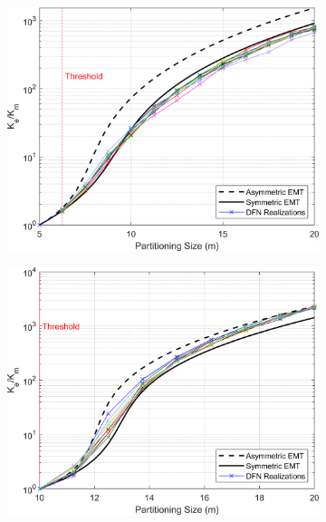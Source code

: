 \documentclass[main.tex]{subfiles}
\begin{document}
\begin{figure}[ht]
    \begin{subfigure}{0.3\textwidth}
        \includegraphics[width=\textwidth]{FSU/Plot_FSU_Case_05_nohead.png}
        \label{fig:FSU_C}
    \end{subfigure}
    \begin{subfigure}{0.3\textwidth}
        \includegraphics[width=\textwidth]{FSU/Plot_FSU_Case_07_nohead.png}
        \label{fig:FSU_D}
    \end{subfigure}
    \begin{subfigure}{0.3\textwidth}

\end{subfigure}
\end{figure}
\end{document}
